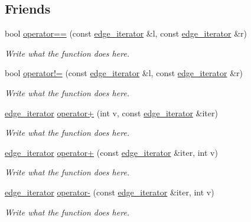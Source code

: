 \subsection*{Friends}
\begin{DoxyCompactItemize}
\item 
bool \hyperlink{classedge__iterator_a28e0f640c1891ad90508ba99546ec535}{operator==} (const \hyperlink{classedge__iterator}{edge\+\_\+iterator} \&l, const \hyperlink{classedge__iterator}{edge\+\_\+iterator} \&r)
\begin{DoxyCompactList}\small\item\em Write what the function does here. \end{DoxyCompactList}\item 
bool \hyperlink{classedge__iterator_af3cf38a5594205c4367bbc054c85a507}{operator!=} (const \hyperlink{classedge__iterator}{edge\+\_\+iterator} \&l, const \hyperlink{classedge__iterator}{edge\+\_\+iterator} \&r)
\begin{DoxyCompactList}\small\item\em Write what the function does here. \end{DoxyCompactList}\item 
\hyperlink{classedge__iterator}{edge\+\_\+iterator} \hyperlink{classedge__iterator_a4ecd4e3679483eda13d5338fd4353d88}{operator+} (int v, const \hyperlink{classedge__iterator}{edge\+\_\+iterator} \&iter)
\begin{DoxyCompactList}\small\item\em Write what the function does here. \end{DoxyCompactList}\item 
\hyperlink{classedge__iterator}{edge\+\_\+iterator} \hyperlink{classedge__iterator_a5dd36755f0bb84f84588c62aef5e5830}{operator+} (const \hyperlink{classedge__iterator}{edge\+\_\+iterator} \&iter, int v)
\begin{DoxyCompactList}\small\item\em Write what the function does here. \end{DoxyCompactList}\item 
\hyperlink{classedge__iterator}{edge\+\_\+iterator} \hyperlink{classedge__iterator_a98fb2143e8ba5e7a043bd4c87c09814f}{operator-\/} (const \hyperlink{classedge__iterator}{edge\+\_\+iterator} \&iter, int v)
\begin{DoxyCompactList}\small\item\em Write what the function does here. \end{DoxyCompactList}\item 

\end{DoxyCompactItemize}
